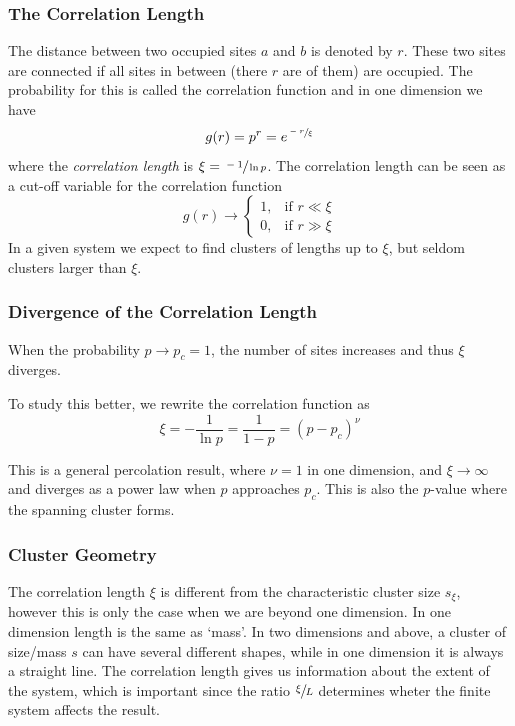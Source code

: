 \documentclass[11pt]{article}
\numberwithin{equation}{section}
\numberwithin{figure}{section}
\newcommand{\ita}[1]{\textit{#1}}
\begin{document}
\subsubsection{The Correlation Length}
The distance between two occupied sites $a$ and $b$ 
is denoted by $r$. These two sites are connected if all
sites in between (there $r$ are of them) are occupied.
The probability for this is called the correlation function
and in one dimension we have
\begin{equation}
        g(r) = p^r = e^{\sfrac{-r}{\xi}}
\end{equation}
where the \ita{correlation length} is $\xi = \sfrac{-1}{\ln p}$.
The correlation length can be seen as a cut-off variable
for the correlation function
\begin{equation}
    g(r)\rightarrow
    \begin{cases}
        1, &\text{if } r\ll \xi\\
        0, &\text{if } r\gg \xi
    \end{cases}
\end{equation}
In a given system we expect to find clusters of lengths up to $\xi$,
but seldom clusters larger than $\xi$.

\subsubsection{Divergence of the Correlation Length}
When the probability $p\rightarrow p_c = 1$, the number of sites
increases and thus $\xi$ diverges.

To study this better, we rewrite the correlation function as
\begin{equation}
    \xi = -\frac{1}{\ln p} = \frac{1}{1-p} =  {(p-p_c)}^{\nu}
\end{equation}

This is a general percolation result, 
where $\nu = 1$ in one dimension, and
$\xi\rightarrow \infty$ and diverges as a power law
when $p$ approaches $p_c$.
This is also the $p$-value where the spanning cluster forms.

\subsubsection{Cluster Geometry}
The correlation length $\xi$ is different from the
characteristic cluster size $s_{\xi}$, however this 
is only the case when we are beyond one dimension.
In one dimension length is the same as `mass'.
In two dimensions and above, a cluster of size/mass $s$
can have several different shapes, while in one dimension
it is always a straight line.
The correlation length gives us information about
the extent of the system, which is important
since the ratio $\sfrac{\xi}{L}$ determines
wheter the finite system affects the result.
\end{document}
